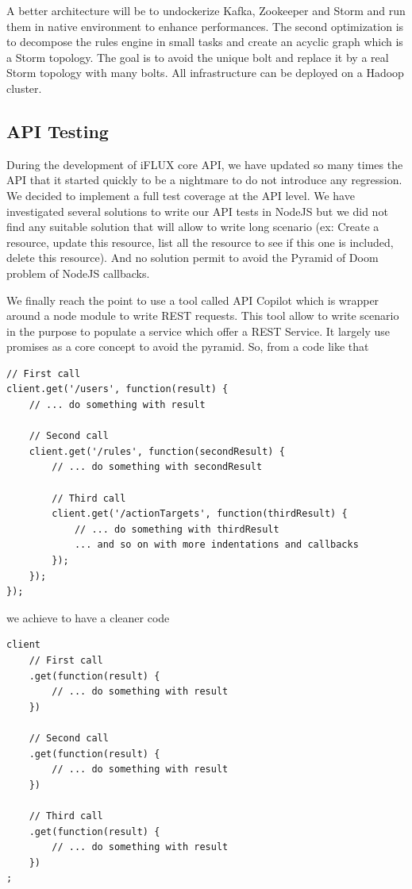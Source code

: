 A better architecture will be to undockerize Kafka, Zookeeper and Storm and run them in native environment to enhance performances. The second optimization is to decompose the rules engine in small tasks and create an acyclic graph which is a Storm topology. The goal is to avoid the unique bolt and replace it by a real Storm topology with many bolts. All infrastructure can be deployed on a Hadoop cluster. 

\subsection{API Testing}

During the development of iFLUX core API, we have updated so many times the API that it started quickly to be a nightmare to do not introduce any regression. We decided to implement a full test coverage at the API level. We have investigated several solutions to write our API tests in NodeJS but we did not find any suitable solution that will allow to write long scenario (ex: Create a resource, update this resource, list all the resource to see if this one is included, delete this resource). And no solution permit to avoid the Pyramid of Doom problem of NodeJS callbacks.

We finally reach the point to use a tool called API Copilot which is wrapper around a node module to write REST requests. This tool allow to write scenario in the purpose to populate a service which offer a REST Service. It largely use promises as a core concept to avoid the pyramid. So, from a code like that

\begin{lstlisting}
// First call
client.get('/users', function(result) {
	// ... do something with result

	// Second call
	client.get('/rules', function(secondResult) {
		// ... do something with secondResult

		// Third call
		client.get('/actionTargets', function(thirdResult) {
			// ... do something with thirdResult
			... and so on with more indentations and callbacks
		});
	});
});
\end{lstlisting}

we achieve to have a cleaner code

\begin{lstlisting}
client
	// First call
	.get(function(result) {
		// ... do something with result
	})
	
	// Second call
	.get(function(result) {
		// ... do something with result
	})
	
	// Third call
	.get(function(result) {
		// ... do something with result
	})
;	
\end{lstlisting}


